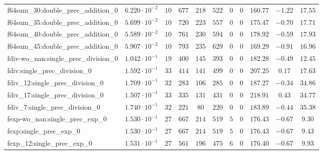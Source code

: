 \begin{tabular}{|l|c|c|c|c|c|c|c|c|c|c|}
f64sum\_30:double\_prec\_addition\_0           & $ 6.220 \cdot 10^{-2} $ & $ 10     $ & $ 677    $ & $ 218   $ & $ 522    $ & $ 0   $ & $ 0 $ & $ 160.77      $ & $ -1.22   $ & $ 17.55   $ \\
f64sum\_35:double\_prec\_addition\_0           & $ 5.699 \cdot 10^{-2} $ & $ 10     $ & $ 720    $ & $ 223   $ & $ 557    $ & $ 0   $ & $ 0 $ & $ 175.47      $ & $ -0.70   $ & $ 17.71   $ \\
f64sum\_40:double\_prec\_addition\_0           & $ 5.589 \cdot 10^{-2} $ & $ 10     $ & $ 761    $ & $ 230   $ & $ 594    $ & $ 0   $ & $ 0 $ & $ 178.92      $ & $ -0.59   $ & $ 17.93   $ \\
f64sum\_45:double\_prec\_addition\_0           & $ 5.907 \cdot 10^{-2} $ & $ 10     $ & $ 793    $ & $ 235   $ & $ 629    $ & $ 0   $ & $ 0 $ & $ 169.29      $ & $ -0.91   $ & $ 16.96   $ \\
fdiv-wo\_nan:single\_prec\_division\_0         & $ 1.042 \cdot 10^{-1} $ & $ 19     $ & $ 400    $ & $ 145   $ & $ 393    $ & $ 0   $ & $ 0 $ & $ 182.28      $ & $ -0.49   $ & $ 12.45   $ \\
fdiv:single\_prec\_division\_0                 & $ 1.592 \cdot 10^{-1} $ & $ 33     $ & $ 414    $ & $ 141   $ & $ 499    $ & $ 0   $ & $ 0 $ & $ 207.25      $ & $ 0.17    $ & $ 17.63   $ \\
fdiv\_12:single\_prec\_division\_0             & $ 1.709 \cdot 10^{-1} $ & $ 32     $ & $ 283    $ & $ 106   $ & $ 285    $ & $ 0   $ & $ 0 $ & $ 187.27      $ & $ -0.34   $ & $ 34.86   $ \\
fdiv\_17:single\_prec\_division\_0             & $ 1.507 \cdot 10^{-1} $ & $ 33     $ & $ 335    $ & $ 131   $ & $ 431    $ & $ 0   $ & $ 0 $ & $ 218.91      $ & $ 0.43    $ & $ 34.77   $ \\
fdiv\_7:single\_prec\_division\_0              & $ 1.740 \cdot 10^{-1} $ & $ 32     $ & $ 221    $ & $ 80    $ & $ 220    $ & $ 0   $ & $ 0 $ & $ 183.89      $ & $ -0.44   $ & $ 35.38   $ \\
fexp-wo\_nan:single\_prec\_exp\_0              & $ 1.530 \cdot 10^{-1} $ & $ 27     $ & $ 667    $ & $ 214   $ & $ 519    $ & $ 5   $ & $ 0 $ & $ 176.43      $ & $ -0.67   $ & $ 9.30    $ \\
fexp:single\_prec\_exp\_0                      & $ 1.530 \cdot 10^{-1} $ & $ 27     $ & $ 667    $ & $ 214   $ & $ 519    $ & $ 5   $ & $ 0 $ & $ 176.43      $ & $ -0.67   $ & $ 9.43    $ \\
fexp\_12:single\_prec\_exp\_0                  & $ 1.531 \cdot 10^{-1} $ & $ 27     $ & $ 561    $ & $ 196   $ & $ 475    $ & $ 6   $ & $ 0 $ & $ 176.40      $ & $ -0.67   $ & $ 9.93    $ \\

\end{tabular}

